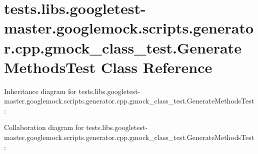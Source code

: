 \hypertarget{classtests_1_1libs_1_1googletest-master_1_1googlemock_1_1scripts_1_1generator_1_1cpp_1_1gmock__c6f2a02cc58616ca1e9b77cf57840d0ce}{}\section{tests.\+libs.\+googletest-\/master.googlemock.\+scripts.\+generator.\+cpp.\+gmock\+\_\+class\+\_\+test.\+Generate\+Methods\+Test Class Reference}
\label{classtests_1_1libs_1_1googletest-master_1_1googlemock_1_1scripts_1_1generator_1_1cpp_1_1gmock__c6f2a02cc58616ca1e9b77cf57840d0ce}


Inheritance diagram for tests.\+libs.\+googletest-\/master.googlemock.\+scripts.\+generator.\+cpp.\+gmock\+\_\+class\+\_\+test.\+Generate\+Methods\+Test\+:


Collaboration diagram for tests.\+libs.\+googletest-\/master.googlemock.\+scripts.\+generator.\+cpp.\+gmock\+\_\+class\+\_\+test.\+Generate\+Methods\+Test\+:
